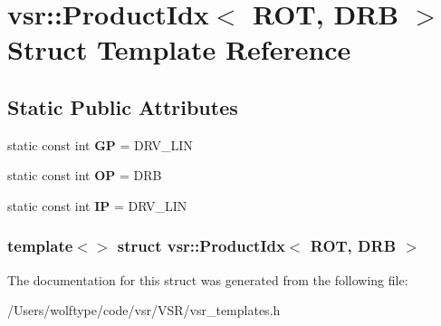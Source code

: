 \hypertarget{structvsr_1_1_product_idx_3_01_r_o_t_00_01_d_r_b_01_4}{\section{vsr\-:\-:Product\-Idx$<$ R\-O\-T, D\-R\-B $>$ Struct Template Reference}
\label{structvsr_1_1_product_idx_3_01_r_o_t_00_01_d_r_b_01_4}
}
\subsection*{Static Public Attributes}
\begin{DoxyCompactItemize}
\item 
\hypertarget{structvsr_1_1_product_idx_3_01_r_o_t_00_01_d_r_b_01_4_ab23e0d4bc09b3b3b29f35be0038d1969}{static const int {\bfseries G\-P} = D\-R\-V\-\_\-\-L\-I\-N}\label{structvsr_1_1_product_idx_3_01_r_o_t_00_01_d_r_b_01_4_ab23e0d4bc09b3b3b29f35be0038d1969}

\item 
\hypertarget{structvsr_1_1_product_idx_3_01_r_o_t_00_01_d_r_b_01_4_a3b3499e5a5d42c4fe5f4cbcfbc73483a}{static const int {\bfseries O\-P} = D\-R\-B}\label{structvsr_1_1_product_idx_3_01_r_o_t_00_01_d_r_b_01_4_a3b3499e5a5d42c4fe5f4cbcfbc73483a}

\item 
\hypertarget{structvsr_1_1_product_idx_3_01_r_o_t_00_01_d_r_b_01_4_a9986573ba23bcb93e11e57f572833fb7}{static const int {\bfseries I\-P} = D\-R\-V\-\_\-\-L\-I\-N}\label{structvsr_1_1_product_idx_3_01_r_o_t_00_01_d_r_b_01_4_a9986573ba23bcb93e11e57f572833fb7}

\end{DoxyCompactItemize}
\subsubsection*{template$<$$>$ struct vsr\-::\-Product\-Idx$<$ R\-O\-T, D\-R\-B $>$}



The documentation for this struct was generated from the following file\-:\begin{DoxyCompactItemize}
\item 
/\-Users/wolftype/code/vsr/\-V\-S\-R/vsr\-\_\-templates.\-h\end{DoxyCompactItemize}
